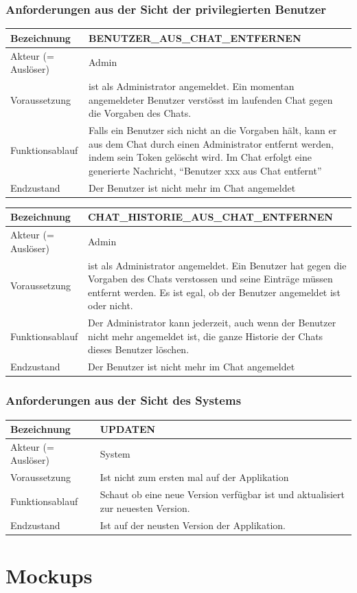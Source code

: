 \documentclass[12pt]{article}
\newcommand{\requirementTable}[5]{
    \begin{table}[H]
      \begin{tabularx}{\textwidth}{|l|X|}
        \hline
        Bezeichnung & #1  \\ \hline
        Akteur (= Auslöser) & #2  \\ \hline
        Voraussetzung & #3  \\ \hline
        Funktionsablauf & #4  \\ \hline
        Endzustand & #5  \\ \hline
      \end{tabularx}
    \end{table}
}
\begin{document}
      \subsubsection{Anforderungen aus der Sicht der privilegierten Benutzer}
        \requirementTable
            {BENUTZER\_AUS\_CHAT\_ENTFERNEN}
            {Admin}
            {
            ist als Administrator angemeldet. \newline 
            Ein momentan angemeldeter Benutzer verstösst im laufenden Chat gegen die Vorgaben des Chats.
            }
            {
            Falls ein Benutzer sich nicht an die Vorgaben hält, kann er aus dem Chat durch einen Administrator entfernt werden, indem sein Token gelöscht wird. \newline
            Im Chat erfolgt eine generierte Nachricht, “Benutzer xxx aus Chat entfernt”
            }
            {Der Benutzer ist nicht mehr im Chat angemeldet}
            
                           
        \requirementTable
            {CHAT\_HISTORIE\_AUS\_CHAT\_ENTFERNEN}
            {Admin}
            {
            ist als Administrator angemeldet. \newline
            Ein  Benutzer hat gegen die Vorgaben des Chats verstossen und seine Einträge müssen entfernt werden. Es ist egal, ob der Benutzer angemeldet ist oder nicht.
            }
            {
            Der Administrator kann jederzeit, auch wenn der Benutzer nicht mehr angemeldet ist, die ganze Historie der Chats dieses Benutzer löschen.
            }
            {
            Der Benutzer ist nicht mehr im Chat angemeldet
            }
            
      \subsubsection{Anforderungen aus der Sicht des Systems}
         \requirementTable
            {UPDATEN}
            {System}
            {Ist nicht zum ersten mal auf der Applikation}
            {Schaut ob eine neue Version verfügbar ist und aktualisiert zur neuesten Version.}
            {Ist auf der neusten Version der Applikation.}
            
    \section{Mockups}
\end{document}
